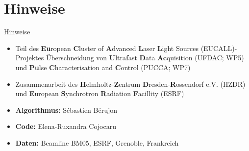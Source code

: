 \section{Hinweise}

\begin{frame}{Hinweise}
	\begin{itemize}
		\item<2-> Teil des \textbf{Eu}ropean \textbf{C}luster of \textbf{A}dvanced \textbf{L}aser \textbf{L}ight Sources (EUCALL)-Projektes
		\rightarrow Überschneidung von \textbf{U}ltra\textbf{f}ast \textbf{D}ata \textbf{Ac}quisition (UFDAC; WP5) und \textbf{Pu}lse \textbf{C}haracterisation and \textbf{C}ontrol (PUCCA; WP7)
		\item<3-> Zusammenarbeit des \textbf{H}elmholtz-\textbf{Z}entrum \textbf{D}resden-\textbf{R}ossendorf e.V. (HZDR) und \textbf{E}uropean \textbf{S}ynchrotron \textbf{R}adiation \textbf{F}acillity (ESRF)
		\item<4-> \textbf{Algorithmus:} Sébastien Bérujon
		\item<5-> \textbf{Code:} Elena-Ruxandra Cojocaru
		\item<6-> \textbf{Daten:} Beamline BM05, ESRF, Grenoble, Frankreich
	\end{itemize}
\end{frame}